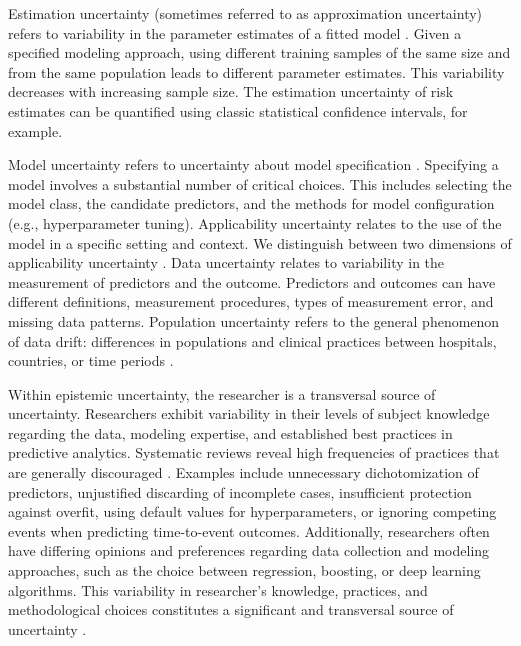 Estimation uncertainty (sometimes referred to as approximation uncertainty) refers to variability in the parameter estimates of a fitted model \cite{rileyStabilityClinicalPrediction2023,rileyClinicalPredictionModels2023}. Given a specified modeling approach, using different training samples of the same size and from the same population leads to different parameter estimates. This variability decreases with increasing sample size. The estimation uncertainty of risk estimates can be quantified using classic statistical confidence intervals, for example. 

Model uncertainty refers to uncertainty about model specification \cite{hullermeierAleatoricEpistemicUncertainty2021,gruberSourcesUncertaintyMachine2023,chatfieldModelUncertaintyData1995}. Specifying a model involves a substantial number of critical choices. This includes selecting the model class, the candidate predictors, and the methods for model configuration (e.g., hyperparameter tuning). Applicability uncertainty relates to the use of the model in a specific setting and context. We distinguish between two dimensions of applicability uncertainty \cite{gruberSourcesUncertaintyMachine2023}. Data uncertainty relates to variability in the measurement of predictors and the outcome. Predictors and outcomes can have different definitions, measurement procedures, types of measurement error, and missing data patterns. Population uncertainty refers to the general phenomenon of data drift: differences in populations and clinical practices between hospitals, countries, or time periods \cite{sahinerDataDriftMedical2023}. 

Within epistemic uncertainty, the researcher is a transversal source of uncertainty. Researchers exhibit variability in their levels of subject knowledge regarding the data, modeling expertise, and established best practices in predictive analytics. Systematic reviews reveal high frequencies of practices that are generally discouraged \cite{christodoulouSystematicReviewShows2019,andaurnavarroSystematicReviewIdentifies2023,dhimanMethodologicalConductPrognostic2022,wynantsPredictionModelsDiagnosis2020}. Examples include unnecessary dichotomization of predictors, unjustified discarding of incomplete cases, insufficient protection against overfit, using default values for hyperparameters, or ignoring competing events when predicting time-to-event outcomes. Additionally, researchers often have differing opinions and preferences regarding data collection and modeling approaches, such as the choice between regression, boosting, or deep learning algorithms. This variability in researcher's knowledge, practices, and methodological choices constitutes a significant and transversal source of uncertainty \cite{rileyStabilityClinicalPrediction2023,rileyClinicalPredictionModels2023,ledgerMulticlassRiskModels2023,pateUncertaintyUsingRisk2019,liConsistencyVarietyMachine2020,rileyUncertaintyRiskEstimates2025}.

